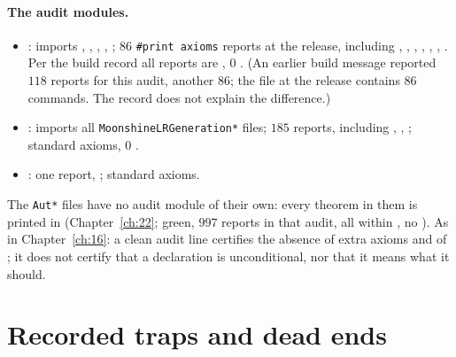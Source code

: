 \paragraph{The audit modules.}
\begin{itemize}
\item {}: imports , ,
  , , ; $86$ \texttt{\#print axioms} reports at the release,
  including , , ,
  , , ,
  .  Per the build record all reports are , 0
  .  (An earlier build message reported $118$ reports for this audit, another $86$; the file at the
  release contains $86$ commands.  The record does not explain the difference.)
\item {}: imports all \texttt{MoonshineLRGeneration*} files; $185$
  reports, including , ,
  ; standard axioms, 0 .
\item {}: one report,
  ; standard axioms.
\end{itemize}
The \texttt{Aut*} files have no audit module of their own: every theorem in them is printed in
 (Chapter~\ref{ch:22}; green, $997$
reports in that audit, all within , no ).  As in Chapter~\ref{ch:16}: a clean audit line certifies the absence of extra axioms and of ; it does
not certify that a declaration is unconditional, nor that it means what it should.

\section{Recorded traps and dead ends}\label{ch20:sec:traps}

